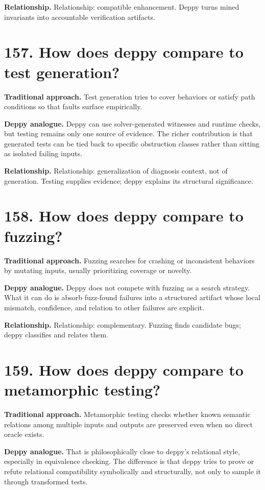 \documentclass[11pt,openany]{book}
\begin{document}
\textbf{Relationship.} Relationship: compatible enhancement. Deppy turns mined invariants into accountable verification artifacts.

\section*{157. How does deppy compare to test generation?}
\textbf{Traditional approach.} Test generation tries to cover behaviors or satisfy path conditions so that faults surface empirically.

\textbf{Deppy analogue.} Deppy can use solver-generated witnesses and runtime checks, but testing remains only one source of evidence. The richer contribution is that generated tests can be tied back to specific obstruction classes rather than sitting as isolated failing inputs.

\textbf{Relationship.} Relationship: generalization of diagnosis context, not of generation. Testing supplies evidence; deppy explains its structural significance.

\section*{158. How does deppy compare to fuzzing?}
\textbf{Traditional approach.} Fuzzing searches for crashing or inconsistent behaviors by mutating inputs, usually prioritizing coverage or novelty.

\textbf{Deppy analogue.} Deppy does not compete with fuzzing as a search strategy. What it can do is absorb fuzz-found failures into a structured artifact whose local mismatch, confidence, and relation to other failures are explicit.

\textbf{Relationship.} Relationship: complementary. Fuzzing finds candidate bugs; deppy classifies and relates them.

\section*{159. How does deppy compare to metamorphic testing?}
\textbf{Traditional approach.} Metamorphic testing checks whether known semantic relations among multiple inputs and outputs are preserved even when no direct oracle exists.

\textbf{Deppy analogue.} That is philosophically close to deppy's relational style, especially in equivalence checking. The difference is that deppy tries to prove or refute relational compatibility symbolically and structurally, not only to sample it through transformed tests.
\end{document}
